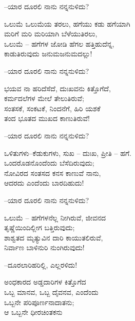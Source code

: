 \begin{flushright}
–ಯಾರ ದೂರಲಿ ನಾನು ನನ್ನನುಳಿದು?
\end{flushright}

\begin{myquote}
ಒಲುಮೆ ಒಲುಮೆಯ ತರಲು, ಹಗೆಯು ಕಡು ಹಗೆಯಾಗಿ\\ಮರಿಗೆ ಮರಿ ಮರಿಯಾಗಿ ಬೆಳೆಯುತಿರಲು,\\ಒಲುಮೆ – ಹಗೆಗಳ ಜೋಡಿ ಹೆಗಲ ಹತ್ತಿಹುದೆನ್ನ,\\ಕಾಡುತಿರುವುದು ಜನುಮಜನುಮದಲ್ಲು!
\end{myquote}

\begin{flushright}
–ಯಾರ ದೂರಲಿ ನಾನು ನನ್ನನುಳಿದು?
\end{flushright}

\begin{myquote}
ಭಯವ ನಾ ಹರಿದೆಸೆದೆ, ದುಃಖವನು ಕಿತ್ತೊಗೆದೆ,\\ಕರ್ಮದಲೆಗಳ ಮೇಲೆ ತೇಲುತಿರುವೆ;\\ಸಂತಸಕೆ, ಸಂಕಟಕೆ, ನಿಂದನೆಗೆ, ಹಿರಿ ಯಶಕೆ\\ತಂದ ಭೂತದ ಮುಖದ ಕಾಣುತಿರುವೆ!
\end{myquote}

\begin{flushright}
–ಯಾರ ದೂರಲಿ ನಾನು ನನ್ನನುಳಿದು?
\end{flushright}

\begin{myquote}
ಒಳಿತುಗಳು–ಕೆಡುಕುಗಳು, ಸುಖ – ದುಃಖ, ಪ್ರೀತಿ – ಹಗೆ.\\ಒಂದರೊಡನೊಂದೆಂದು ಬೆಸೆದಿರುವುದು;\\ನೋವಿರದ ಸಂತಸದ ಕನಸ ಕಾಣುವೆ ನಾನು,\\ಆದರದು ಎಂದೆಂದು ಬಾರದಿಹುದು!
\end{myquote}

\begin{flushright}
–ಯಾರ ದೂರಲಿ ನಾನು ನನ್ನನುಳಿದು?
\end{flushright}

\begin{myquote}
ಒಲುಮೆ – ಹಗೆಗಳನೆಲ್ಲ ನೀಗಿರುವೆ, ಜೀವನದ\\ತೃಷ್ಣೆಯಿಂದಿಲ್ಲೀಗ ಬತ್ತಿರುವುದು;\\ಶಾಶ್ವತದ ಮೃತ್ಯುವಿನ ದಾರಿ ಕಾಯುತಲಿರುವೆ,\\ನಿರ್ವಾಣ ಬಾಳಿನುರಿ ನುಂಗಿರುವುದು!
\end{myquote}

\begin{flushright}
–ದೂರಲಾರಿಹರಿಲ್ಲಿ, ಎಲ್ಲರಳಿದು!
\end{flushright}

\begin{myquote}
ಅಂಧಕಾರದ ಅಡ್ಡದಾರಿಗಳ ಕಿತ್ತೊಗೆದ\\ಒಬ್ಬ ಮಾನವ, ಒಬ್ಬ ದೈವನವ, ಎಂದೆಂದು\\ಒಬ್ಬನೇ ಪರಿಪೂರ್ಣನಾದಾತನು;\\ಆ ಒಬ್ಬನೇ ಧೀರಚಿಂತಕನು
\end{myquote}

